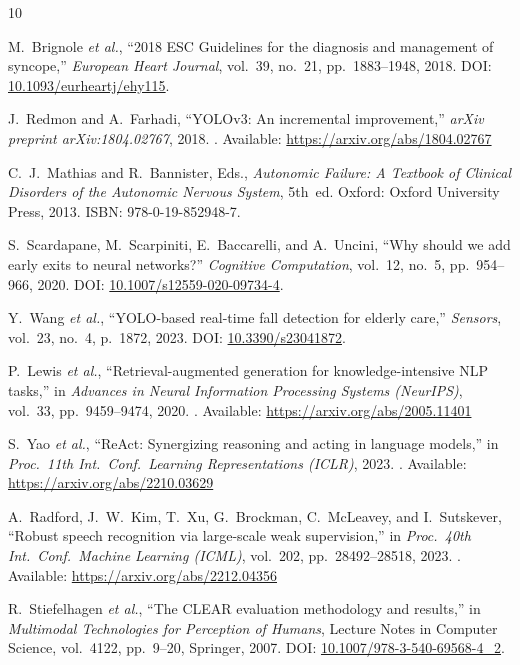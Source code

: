 \documentclass[10pt,twocolumn,a4paper]{article}
\begin{document}
\begin{thebibliography}{10}

M.~Brignole \textit{et al.},
``2018 ESC Guidelines for the diagnosis and management of syncope,''
\textit{European Heart Journal}, vol.~39, no.~21, pp.~1883--1948, 2018.
\newblock DOI: \href{https://doi.org/10.1093/eurheartj/ehy115}{10.1093/eurheartj/ehy115}.

J.~Redmon and A.~Farhadi,
``YOLOv3: An incremental improvement,''
\textit{arXiv preprint arXiv:1804.02767}, 2018.
\newblock [Online]. Available: \url{https://arxiv.org/abs/1804.02767}

C.~J.~Mathias and R.~Bannister, Eds.,
\textit{Autonomic Failure: A Textbook of Clinical Disorders of the
Autonomic Nervous System}, 5th~ed.
Oxford: Oxford University Press, 2013.
\newblock ISBN: 978-0-19-852948-7.

S.~Scardapane, M.~Scarpiniti, E.~Baccarelli, and A.~Uncini,
``Why should we add early exits to neural networks?''
\textit{Cognitive Computation}, vol.~12, no.~5, pp.~954--966, 2020.
\newblock DOI: \href{https://doi.org/10.1007/s12559-020-09734-4}{10.1007/s12559-020-09734-4}.

Y.~Wang \textit{et al.},
``YOLO-based real-time fall detection for elderly care,''
\textit{Sensors}, vol.~23, no.~4, p.~1872, 2023.
\newblock DOI: \href{https://doi.org/10.3390/s23041872}{10.3390/s23041872}.

P.~Lewis \textit{et al.},
``Retrieval-augmented generation for knowledge-intensive NLP tasks,''
in \textit{Advances in Neural Information Processing Systems (NeurIPS)},
vol.~33, pp.~9459--9474, 2020.
\newblock [Online]. Available: \url{https://arxiv.org/abs/2005.11401}

S.~Yao \textit{et al.},
``ReAct: Synergizing reasoning and acting in language models,''
in \textit{Proc.\ 11th Int.\ Conf.\ Learning Representations (ICLR)}, 2023.
\newblock [Online]. Available: \url{https://arxiv.org/abs/2210.03629}

A.~Radford, J.~W.~Kim, T.~Xu, G.~Brockman, C.~McLeavey, and I.~Sutskever,
``Robust speech recognition via large-scale weak supervision,''
in \textit{Proc.\ 40th Int.\ Conf.\ Machine Learning (ICML)},
vol.~202, pp.~28492--28518, 2023.
\newblock [Online]. Available: \url{https://arxiv.org/abs/2212.04356}

R.~Stiefelhagen \textit{et al.},
``The CLEAR evaluation methodology and results,''
in \textit{Multimodal Technologies for Perception of Humans},
Lecture Notes in Computer Science, vol.~4122, pp.~9--20, Springer, 2007.
\newblock DOI: \href{https://doi.org/10.1007/978-3-540-69568-4_2}{10.1007/978-3-540-69568-4\_2}.


\end{thebibliography}
\end{document}
